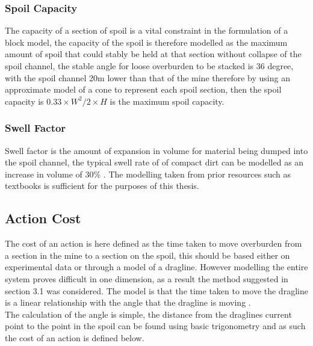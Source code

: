 \subsubsection{Spoil Capacity}
The capacity of a section of spoil is a vital constraint in the formulation of a block model, the capacity of the spoil is therefore modelled as the maximum amount of spoil that could stably be held at that section without collapse of the spoil channel, the stable angle for loose overburden to be stacked is 36 degree, with the spoil channel 20m lower than that of the mine therefore by using an approximate model of a cone to represent each spoil section, then the spoil capacity is $0.33\times W^2/2 \times H $ is the maximum spoil capacity. 
\subsubsection{Swell Factor}
Swell factor is the amount of expansion in volume for material being dumped into the spoil channel, the typical swell rate of of compact dirt can be modelled as an increase in volume of 30\% \cite{SpoilUtilization}. The modelling taken from prior resources such as textbooks is sufficient for the purposes of this thesis.

	

\subsection{Action Cost}
The cost of an action is here defined as the time taken to move overburden from a section in the mine to a section on the spoil, this should be based either on experimental data or through a  model of a dragline. However modelling the entire system proves difficult in one dimension, as a result the method suggested in section 3.1 was considered. The model is that  the time taken to move the dragline is a linear relationship with the angle that the dragline is moving \cite{Dmove}. \\The calculation of the angle is simple, the distance from the draglines current point to the point in the spoil can be found using basic trigonometry and as such the cost of an action is defined below. 

